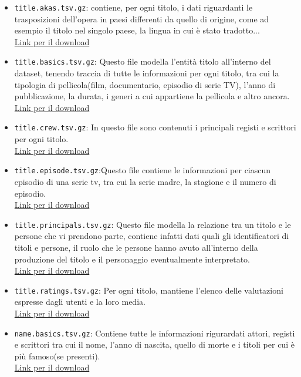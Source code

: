 \documentclass[hidelinks]{article}
\begin{document}
\begin{itemize}
	\item \texttt{title.akas.tsv.gz}: contiene, per ogni titolo, i dati riguardanti le trasposizioni dell'opera in paesi differenti da quello di origine, come ad esempio il titolo nel singolo paese, la lingua in cui è stato tradotto...\\
	\href{https://datasets.imdbws.com/title.akas.tsv.gz}{Link per il download}
	\item \texttt{title.basics.tsv.gz}: Questo file modella l'entità titolo all'interno del dataset, tenendo traccia di tutte le informazioni per ogni titolo, tra cui la tipologia di pellicola(film, documentario, episodio di serie TV), l'anno di pubblicazione, la durata, i generi a cui appartiene la pellicola e altro ancora.\\
	\href{https://datasets.imdbws.com/title.basics.tsv.gz}{Link per il download}
	\item \texttt{title.crew.tsv.gz}: In questo file sono contenuti i principali registi e scrittori per ogni titolo.\\
	\href{https://datasets.imdbws.com/title.crew.tsv.gz}{Link per il download}
	\item \texttt{title.episode.tsv.gz}:Questo file contiene le informazioni per ciascun episodio di una serie tv, tra cui la serie madre, la stagione e il numero di episodio.\\
	\href{https://datasets.imdbws.com/title.episode.tsv.gz}{Link per il download}
	\item \texttt{title.principals.tsv.gz}: Questo file modella la relazione tra un titolo e le persone che vi prendono parte, contiene infatti dati quali gli identificatori di titoli e persone, il ruolo che le persone hanno avuto all'interno della produzione del titolo e il personaggio eventualmente interpretato.\\
	\href{https://datasets.imdbws.com/title.principals.tsv.gz}{Link per il download}
	\item \texttt{title.ratings.tsv.gz}: Per ogni titolo, mantiene l'elenco delle valutazioni espresse dagli utenti e la loro media.\\
	\href{https://datasets.imdbws.com/title.ratings.tsv.gz}{Link per il download}
	\item \texttt{name.basics.tsv.gz}: Contiene tutte le informazioni rigurardati attori, registi e scrittori tra cui il nome, l'anno di nascita, quello di morte e i titoli per cui è più famoso(se presenti).\\
	\href{https://datasets.imdbws.com/name.basics.tsv.gz}{Link per il download}
\end{itemize}
\end{document}
